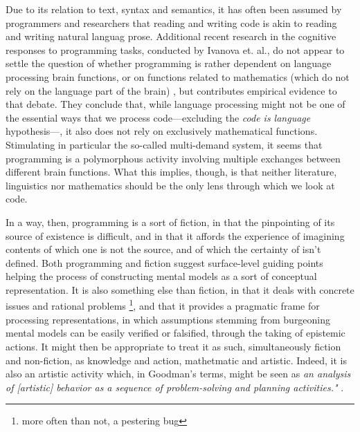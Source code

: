 Due to its relation to text, syntax and semantics, it has often been assumed by programmers and researchers that reading and writing code is akin to reading and writing natural languag prose. Additional recent research in the cognitive responses to programming tasks, conducted by Ivanova et. al., do not appear to settle the question of whether programming is rather dependent on language processing brain functions, or on functions related to mathematics (which do not rely on the language part of the brain) \citep{ivanova_comprehension_2020}, but contributes empirical evidence to that debate. They conclude that, while language processing might not be one of the essential ways that we process code—excluding the \emph{code is language} hypothesis—, it also does not rely on exclusively mathematical functions. Stimulating in particular the so-called multi-demand system, it seems that programming is a polymorphous activity involving multiple exchanges between different brain functions. What this implies, though, is that neither literature, linguistics nor mathematics should be the only lens through which we look at code.

In a way, then, programming is a sort of fiction, in that the pinpointing of its source of existence is difficult, and in that it affords the experience of imagining contents of which one is not the source, and of which the certainty of isn't defined. Both programming and fiction suggest surface-level guiding points helping the process of constructing mental models as a sort of conceptual representation. It is also something else than fiction, in that it deals with concrete issues and rational problems \footnote{more often than not, a pestering bug}, and that it provides a pragmatic frame for processing representations, in which assumptions stemming from burgeoning mental models can be easily verified or falsified, through the taking of epistemic actions. It might then be appropriate to treat it as such, simultaneously fiction and non-fiction, as knowledge and action, mathetmatic and artistic. Indeed, it is also an artistic activity which, in Goodman's terms, might be seen as \emph{an analysis of [artistic] behavior as a sequence of problem-solving and planning activities."} \citep{goodman_basic_1972}.

